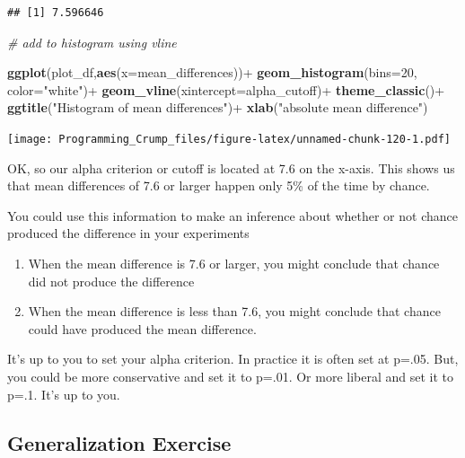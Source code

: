 \documentclass[]{book}
\newenvironment{Shaded}{\begin{snugshade}}{\end{snugshade}}
\newcommand{\KeywordTok}[1]{\textcolor[rgb]{0.13,0.29,0.53}{\textbf{{#1}}}}
\newcommand{\DataTypeTok}[1]{\textcolor[rgb]{0.13,0.29,0.53}{{#1}}}
\newcommand{\DecValTok}[1]{\textcolor[rgb]{0.00,0.00,0.81}{{#1}}}
\newcommand{\StringTok}[1]{\textcolor[rgb]{0.31,0.60,0.02}{{#1}}}
\newcommand{\CommentTok}[1]{\textcolor[rgb]{0.56,0.35,0.01}{\textit{{#1}}}}
\newcommand{\NormalTok}[1]{{#1}}
\theoremstyle{definition}
\theoremstyle{definition}
\theoremstyle{definition}
\theoremstyle{remark}
\begin{document}
\begin{verbatim}
## [1] 7.596646
\end{verbatim}

\begin{Shaded}
\begin{Highlighting}[]
\CommentTok{# add to histogram using vline}

\KeywordTok{ggplot}\NormalTok{(plot_df,}\KeywordTok{aes}\NormalTok{(}\DataTypeTok{x=}\NormalTok{mean_differences))+}
\StringTok{  }\KeywordTok{geom_histogram}\NormalTok{(}\DataTypeTok{bins=}\DecValTok{20}\NormalTok{, }\DataTypeTok{color=}\StringTok{"white"}\NormalTok{)+}
\StringTok{  }\KeywordTok{geom_vline}\NormalTok{(}\DataTypeTok{xintercept=}\NormalTok{alpha_cutoff)+}
\StringTok{  }\KeywordTok{theme_classic}\NormalTok{()+}
\StringTok{  }\KeywordTok{ggtitle}\NormalTok{(}\StringTok{"Histogram of mean differences"}\NormalTok{)+}
\StringTok{  }\KeywordTok{xlab}\NormalTok{(}\StringTok{"absolute mean difference"}\NormalTok{)}
\end{Highlighting}
\end{Shaded}

\texttt{[image: Programming\_Crump\_files/figure-latex/unnamed-chunk-120-1.pdf]}

OK, so our alpha criterion or cutoff is located at 7.6 on the x-axis.
This shows us that mean differences of 7.6 or larger happen only 5\% of
the time by chance.

You could use this information to make an inference about whether or not
chance produced the difference in your experiments

\begin{enumerate}
\def\labelenumi{\arabic{enumi}.}
\item
  When the mean difference is 7.6 or larger, you might conclude that
  chance did not produce the difference
\item
  When the mean difference is less than 7.6, you might conclude that
  chance could have produced the mean difference.
\end{enumerate}

It's up to you to set your alpha criterion. In practice it is often set
at p=.05. But, you could be more conservative and set it to p=.01. Or
more liberal and set it to p=.1. It's up to you.

\subsection{Generalization Exercise}\label{generalization-exercise-3}
\end{document}
